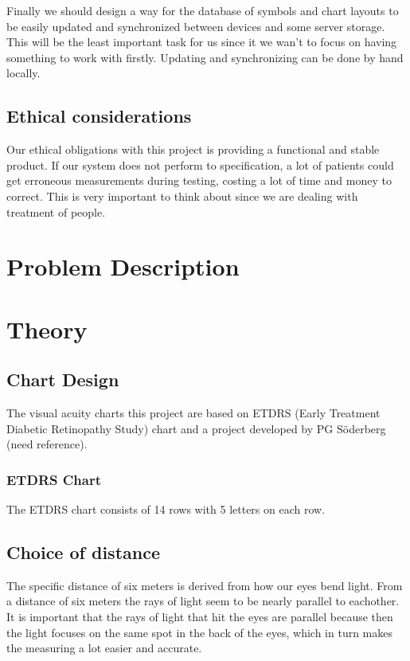 \documentclass[12pt,a4paper,notitlepage]{report}
\begin{document}
Finally we should design a way for the database of symbols and chart layouts to be easily updated and synchronized between devices and some server storage. This will be the least important task for us since it we wan't to focus on having something to work with firstly. Updating and synchronizing can be done by hand locally.

\section{Ethical considerations} %
Our ethical obligations with this project is providing a functional and stable product. If our system does not perform to specification, a lot of patients could get erroneous measurements during testing, costing a lot of time and money to correct. This is very important to think about since we are dealing with treatment of people.

\chapter{Problem Description}

\chapter{Theory}

\section{Chart Design}
The visual acuity charts this project are based on ETDRS (Early Treatment Diabetic Retinopathy Study) chart\cite{Ferris} and a project developed by PG Söderberg (need reference). 

\subsection{ETDRS Chart}
The ETDRS chart consists of 14 rows with 5 letters on each row.

\section{Choice of distance} %

The specific distance of six meters is derived from how our eyes bend light. From a distance of six meters the rays of light seem to be nearly parallel to eachother. %
It is important that the rays of light that hit the eyes are parallel because then the light focuses on the same spot in the back of the eyes, which in turn makes the measuring a lot easier and accurate. \cite{PGSoderberg} %
\end{document}
